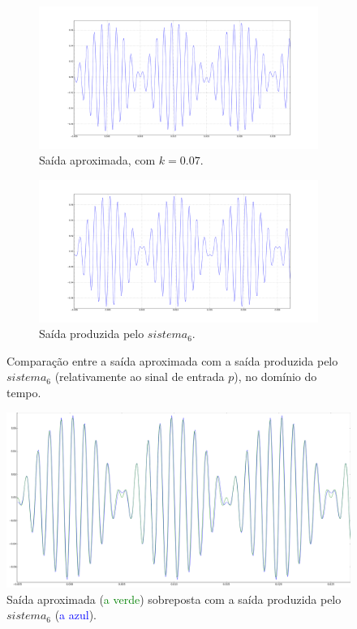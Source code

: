 \begin{figure}[H] 
    \begin{subfigure}[b]{0.5\linewidth}
        \centering
        \includegraphics[width=1\linewidth]{prints/saida_experimental_sistema6.png}
        \caption{Saída aproximada, com \(k = 0.07\).} 
        \label{fig:saida_experimental_sistema6} 
    \end{subfigure}%
    \begin{subfigure}[b]{0.5\linewidth}
        \centering
        \includegraphics[width=1\linewidth]{prints/sistema6_p.png} 
        \caption{Saída produzida pelo \(sistema_6\).} 
        \label{fig:sistema6_p} 
    \end{subfigure} 
    \caption{Comparação entre a saída aproximada com a saída produzida pelo \(sistema_6\) (relativamente ao sinal de entrada \(p\)), no domínio do tempo.}
    \label{fig:multiplas_7}
\end{figure}

\begin{figure}[ht]
    \centering
    \includegraphics[width = 0.5\linewidth]{prints/sobrepostos_sistema6.png}   
    \caption{Saída aproximada (\textcolor{Green}{a verde}) sobreposta com a saída produzida pelo \(sistema_6\) (\textcolor{Blue}{a azul}).}
    \label{fig:sobrepostos_sistema6}
\end{figure}

